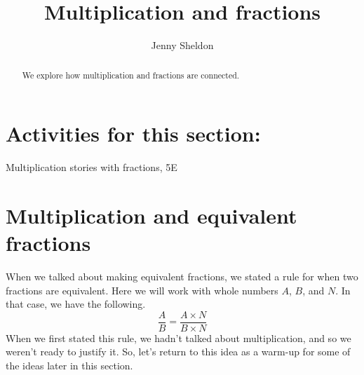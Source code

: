 \documentclass{ximera}
\title{Multiplication and fractions}
\author{Jenny Sheldon}
\begin{document}
\begin{abstract}
We explore how multiplication and fractions are connected.
\end{abstract}
\maketitle

\section{Activities for this section:} Multiplication stories with fractions, 5E

\section{Multiplication and equivalent fractions}

When we talked about making equivalent fractions, we stated a rule for when two fractions are equivalent. Here we will work with whole numbers $A$, $B$, and $N$. In that case, we have the following.
\[
\frac{A}{B} = \frac{A \times N}{B \times N}
\]
When we first stated this rule, we hadn't talked about multiplication, and so we weren't ready to justify it. So, let's return to this idea as a warm-up for some of the ideas later in this section.
\end{document}
